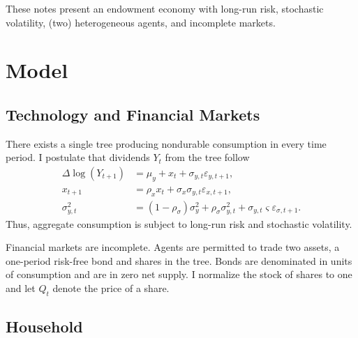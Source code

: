 \documentclass[12 pt, oneside]{article}
\theoremstyle{definition}
\theoremstyle{definition}
\theoremstyle{definition}
\begin{document}
These notes present an endowment economy with long-run risk, stochastic volatility, (two) heterogeneous agents, and incomplete markets.

\section{Model}\label{sec:model}


\subsection{Technology and Financial Markets}
There exists a single tree producing nondurable consumption in every time period. I postulate that dividends $Y_t$ from the tree follow
\begin{align}\label{eq:endowment growth}
  \Delta \log(Y_{t + 1}) & = \mu_y + x_t + \sigma_{y, t} \varepsilon_{y, t + 1},\\
  \label{eq:long run risk}
  x_{t + 1} & = \rho_x x_t + \sigma_x \sigma_{y, t} \varepsilon_{x, t + 1},\\
  \label{eq:stochastic volatility}
  \sigma_{y, t}^2 & = (1 - \rho_\sigma) \sigma_y^2 + \rho_\sigma \sigma_{y, t}^2 + \sigma_{y, t}\varsigma \varepsilon_{\sigma, t + 1}.
\end{align}
Thus, aggregate consumption is subject to long-run risk and stochastic volatility.

Financial markets are incomplete. Agents are permitted to trade two assets, a one-period risk-free bond and shares in the tree. Bonds are denominated in units of consumption and are in zero net supply. I normalize the stock of shares to one and let $Q_t$ denote the price of a share.

\subsection{Household}
\end{document}
